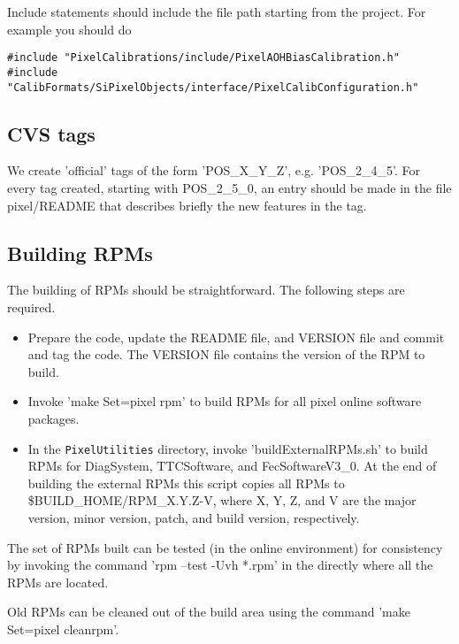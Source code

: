 Include statements should include the file path 
starting from the project. For example you should do

\begin{verbatim}
#include "PixelCalibrations/include/PixelAOHBiasCalibration.h"
#include "CalibFormats/SiPixelObjects/interface/PixelCalibConfiguration.h"
\end{verbatim}

\subsection{CVS tags}

We create 'official' tags of the form 'POS\_X\_Y\_Z',
e.g. 'POS\_2\_4\_5'. For every tag created, starting
with POS\_2\_5\_0, an entry should be made in the
file pixel/README that describes briefly the new
features in the tag.

\subsection{Building RPMs}

The building of RPMs should be straightforward. The
following steps are required.
\begin{itemize}
\item Prepare the code, update the README file, and VERSION file and
      commit and tag the code. The VERSION file contains the version
      of the RPM to build.
\item Invoke 'make Set=pixel rpm' to build RPMs for all pixel online software 
      packages.
\item In the {\tt PixelUtilities} directory, invoke 'buildExternalRPMs.sh'
      to build RPMs for DiagSystem, TTCSoftware, and FecSoftwareV3\_0.
      At the end of building the external RPMs this script copies
      all RPMs to \$BUILD\_HOME/RPM\_X.Y.Z-V, where X, Y, Z, and V are
      the major version, minor version, patch, and build version, 
      respectively.
\end{itemize}
The set of RPMs built can be tested (in the online environment) for
consistency by invoking the command 'rpm --test -Uvh *.rpm' in the directly
where all the RPMs are located.

Old RPMs can be cleaned out of the build area using the command 'make Set=pixel cleanrpm'.

\clearpage

